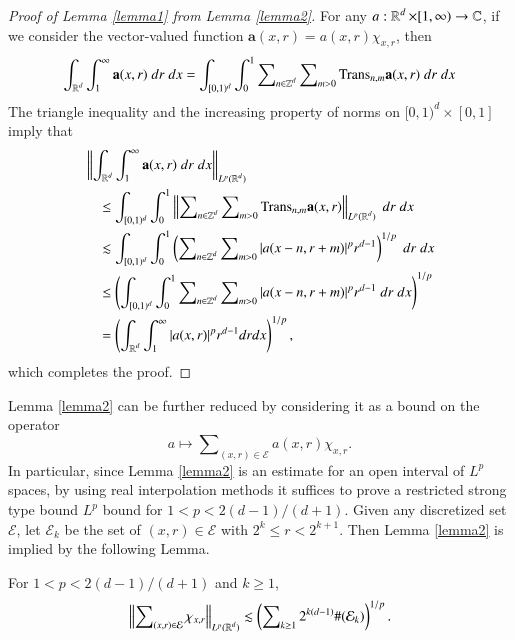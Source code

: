 \begin{proof}[Proof of Lemma \ref{lemma1} from Lemma \ref{lemma2}]
    For any $a: \operatorname{\mathbb{R}}^d \times [1,\infty) \to \operatorname{\mathbb{C}}$, if we consider the vector-valued function $\mathbf{a}(x,r) = a(x,r) \chi_{x,r}$, then
    \begin{equation}
      \int_{\operatorname{\mathbb{R}}^d} \int_1^\infty \mathbf{a}(x,r)\; dr\; dx = \int_{[0,1)^d} \int_0^1 \sum\nolimits_{n \in \operatorname{\mathbb{Z}}^d} \sum\nolimits_{m > 0} \text{Trans}_{n,m} \mathbf{a}(x,r)\; dr\; dx
    \end{equation}
    The triangle inequality and the increasing property of norms on $[0,1)^d \times [0,1]$ imply that
    \begin{equation}
    \begin{split}
    &\left\| \int_{\operatorname{\mathbb{R}}^d} \int_1^\infty \mathbf{a}(x,r)\; dr\; dx \right\|_{L^p(\operatorname{\mathbb{R}}^d)}\\
    &\quad \leq \int_{[0,1)^d} \int_0^1 \left\| \sum\nolimits_{n \in \operatorname{\mathbb{Z}}^d} \sum\nolimits_{m > 0} \text{Trans}_{n,m} \mathbf{a}(x,r) \right\|_{L^p(\operatorname{\mathbb{R}}^d)}\; dr\; dx\\
    &\quad \lesssim \int_{[0,1)^d} \int_0^1 \left( \sum\nolimits_{n \in \operatorname{\mathbb{Z}}^d} \sum\nolimits_{m > 0} |a(x - n, r + m)|^p r^{d-1} \right)^{1/p}\; dr\; dx\\
    &\quad \leq \left( \int_{[0,1)^d} \int_0^1 \sum\nolimits_{n \in \operatorname{\mathbb{Z}}^d} \sum\nolimits_{m > 0} |a(x - n, r + m)|^p r^{d-1}\; dr\; dx \right)^{1/p}\\
    &\quad = \left( \int_{\operatorname{\mathbb{R}}^d} \int_1^\infty |a(x,r)|^p r^{d-1} dr dx \right)^{1/p},
    \end{split}
    \end{equation}
    which completes the proof.
\end{proof}

Lemma \ref{lemma2} can be further reduced by considering it as a bound on the operator
%
\begin{equation}
  a \mapsto \sum\nolimits_{(x,r) \in \mathcal{E}} a(x,r) \chi_{x,r}.
\end{equation}
%
In particular, since Lemma \ref{lemma2} is an estimate for an open interval of $L^p$ spaces, by using real interpolation methods it suffices to prove a restricted strong type bound $L^p$ bound for $1 < p < 2(d-1)/(d+1)$. Given any discretized set $\mathcal{E}$, let $\mathcal{E}_k$ be the set of $(x,r) \in \mathcal{E}$ with $2^k \leq r < 2^{k+1}$. Then Lemma \ref{lemma2} is implied by the following Lemma.

\begin{lemma} \label{lemma3}
    For $1 < p < 2(d-1)/(d+1)$ and $k \geq 1$,
    \[ \left\| \sum\nolimits_{(x,r) \in \mathcal{E}} \chi_{x,r} \right\|_{L^p(\operatorname{\mathbb{R}}^d)} \lesssim \left( \sum\nolimits_{k \geq 1} 2^{k(d-1)} \#(\mathcal{E}_k) \right)^{1/p}. \]
\end{lemma}

